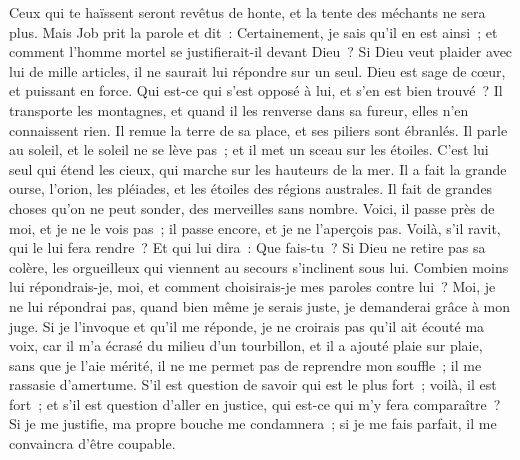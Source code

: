 \begin{multicols}{2}
Ceux qui te haïssent seront revêtus de honte, et la tente des méchants ne sera plus.
\VerseOne{}Mais Job prit la parole et dit~:
Certainement, je sais qu'il en est ainsi~; et comment l'homme mortel se justifierait-il devant Dieu~?
Si Dieu veut plaider avec lui de mille articles, il ne saurait lui répondre sur un seul.
 Dieu est sage de cœur, et puissant en force. Qui est-ce qui s'est opposé à lui, et s'en est bien trouvé~?
Il transporte les montagnes, et quand il les renverse dans sa fureur, elles n'en connaissent rien.
Il remue la terre de sa place, et ses piliers sont ébranlés.
Il parle au soleil, et le soleil ne se lève pas~; et il met un sceau sur les étoiles.
 C'est lui seul qui étend les cieux, qui marche sur les hauteurs de la mer.
Il a fait la grande ourse, l'orion, les pléiades, et les étoiles des régions australes.
Il fait de grandes choses qu'on ne peut sonder, des merveilles sans nombre.
Voici, il passe près de moi, et je ne le vois pas~; il passe encore, et je ne l'aperçois pas.
Voilà, s'il ravit, qui le lui fera rendre~? Et qui lui dira~: Que fais-tu~?
Si Dieu ne retire pas sa colère, les orgueilleux qui viennent au secours s'inclinent sous lui.
Combien moins lui répondrais-je, moi, et comment choisirais-je mes paroles contre lui~? 
Moi, je ne lui répondrai pas, quand bien même je serais juste, je demanderai grâce à mon juge.
Si je l'invoque et qu'il me réponde, je ne croirais pas qu'il ait écouté ma voix,
car il m'a écrasé du milieu d'un tourbillon, et il a ajouté plaie sur plaie, sans que je l'aie mérité, 
il ne me permet pas de reprendre mon souffle~; il me rassasie d'amertume.
S'il est question de savoir qui est le plus fort~; voilà, il est fort~; et s'il est question d'aller en justice, qui est-ce qui m'y fera comparaître~? 
Si je me justifie, ma propre bouche me condamnera~; si je me fais parfait, il me convaincra d'être coupable.

\end{multicols}
